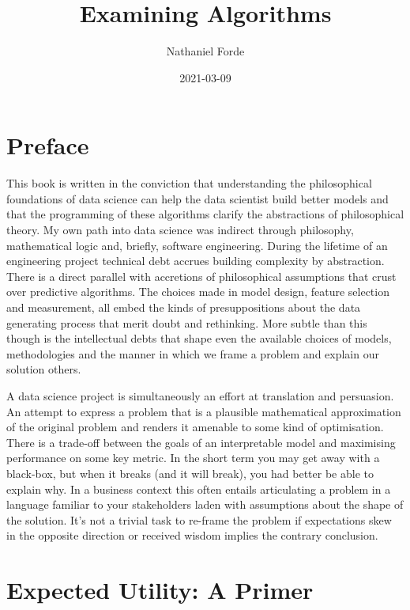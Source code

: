 \documentclass[
]{book}
\title{Examining Algorithms}
\author{Nathaniel Forde}
\date{2021-03-09}
\theoremstyle{definition}
\theoremstyle{definition}
\theoremstyle{definition}
\theoremstyle{remark}
\begin{document}
\maketitle

{
\setcounter{tocdepth}{1}
\tableofcontents
}
\hypertarget{preface}{%
\chapter{Preface}\label{preface}}

This book is written in the conviction that understanding the philosophical foundations of data science can help the data scientist build better models and that the programming of these algorithms clarify the abstractions of philosophical theory. My own path into data science was indirect through philosophy, mathematical logic and, briefly, software engineering. During the lifetime of an engineering project technical debt accrues building complexity by abstraction. There is a direct parallel with accretions of philosophical assumptions that crust over predictive algorithms. The choices made in model design, feature selection and measurement, all embed the kinds of presuppositions about the data generating process that merit doubt and rethinking. More subtle than this though is the intellectual debts that shape even the available choices of models, methodologies and the manner in which we frame a problem and explain our solution others.

A data science project is simultaneously an effort at translation and persuasion. An attempt to express a problem that is a plausible mathematical approximation of the original problem and renders it amenable to some kind of optimisation. There is a trade-off between the goals of an interpretable model and maximising performance on some key metric. In the short term you may get away with a black-box, but when it breaks (and it will break), you had better be able to explain why. In a business context this often entails articulating a problem in a language familiar to your stakeholders laden with assumptions about the shape of the solution. It's not a trivial task to re-frame the problem if expectations skew in the opposite direction or received wisdom implies the contrary conclusion.

\hypertarget{expected-utility-a-primer}{%
\chapter{Expected Utility: A Primer}\label{expected-utility-a-primer}}
\end{document}
